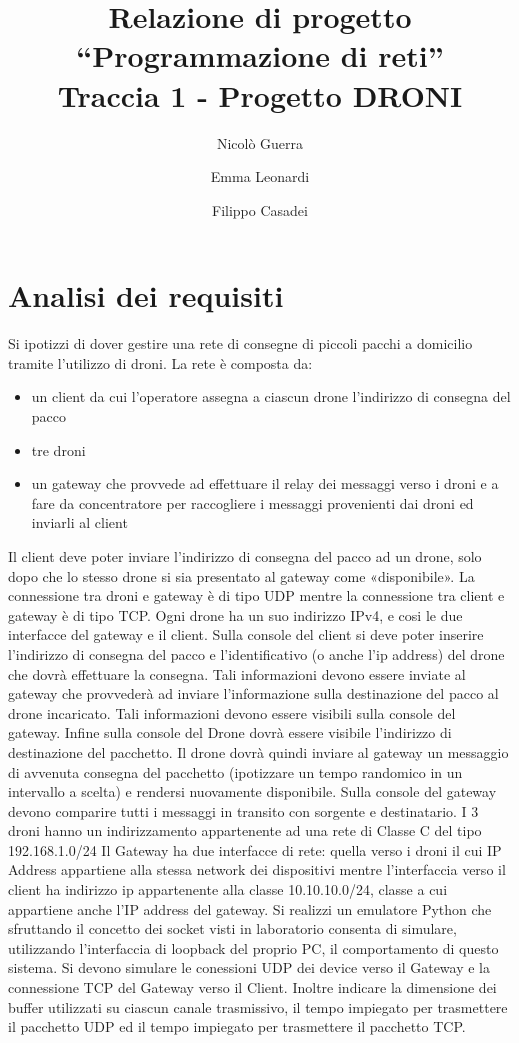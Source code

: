\documentclass[a4paper,12pt]{report}
\title{Relazione di progetto \\``Programmazione di reti''\\Traccia 1 - Progetto DRONI}
\author{Nicolò Guerra \and
Emma Leonardi \and
Filippo Casadei 
}
\begin{document}
\maketitle

\tableofcontents

\chapter{Analisi dei requisiti}

Si ipotizzi di dover gestire una rete di consegne di piccoli pacchi a domicilio tramite l’utilizzo di droni. La rete è
composta da:

\begin{itemize}
    \item un client da cui l’operatore assegna a ciascun drone l’indirizzo di consegna del pacco
    \item tre droni
    \item un gateway che provvede ad effettuare il relay dei messaggi verso i droni e a fare da concentratore per raccogliere i messaggi provenienti dai droni ed inviarli al client
\end{itemize}

Il client deve poter inviare l’indirizzo di consegna del pacco ad un drone, solo dopo che lo stesso drone si sia
presentato al gateway come «disponibile». La connessione tra droni e gateway è di tipo UDP mentre la
connessione tra client e gateway è di tipo TCP.
Ogni drone ha un suo indirizzo IPv4, e cosi le due interfacce del gateway e il client.
Sulla console del client si deve poter inserire l’indirizzo di consegna del pacco e l’identificativo (o anche l’ip
address) del drone che dovrà effettuare la consegna. Tali informazioni devono essere inviate al gateway che
provvederà ad inviare l’informazione sulla destinazione del pacco al drone incaricato. Tali informazioni devono
essere visibili sulla console del gateway.
Infine sulla console del Drone dovrà essere visibile l’indirizzo di destinazione del pacchetto. Il drone dovrà quindi
inviare al gateway un messaggio di avvenuta consegna del pacchetto (ipotizzare un tempo randomico in un
intervallo a scelta) e rendersi nuovamente disponibile.
Sulla console del gateway devono comparire tutti i messaggi in transito con sorgente e destinatario.
I 3 droni hanno un indirizzamento appartenente ad una rete di Classe C del tipo 192.168.1.0/24
Il Gateway ha due interfacce di rete: quella verso i droni il cui IP Address appartiene alla stessa network dei dispositivi mentre l’interfaccia verso il client ha indirizzo
ip appartenente alla classe 10.10.10.0/24, classe a cui appartiene anche l’IP address del gateway.
Si realizzi un emulatore Python che sfruttando il concetto dei socket visti in laboratorio consenta di simulare, utilizzando l’interfaccia di loopback del proprio PC, il
comportamento di questo sistema.
Si devono simulare le conessioni UDP dei device verso il Gateway e la connessione TCP del Gateway verso il Client. Inoltre indicare la dimensione dei buffer utilizzati
su ciascun canale trasmissivo, il tempo impiegato per trasmettere il pacchetto UDP ed il tempo impiegato per trasmettere il pacchetto TCP.
\end{document}
